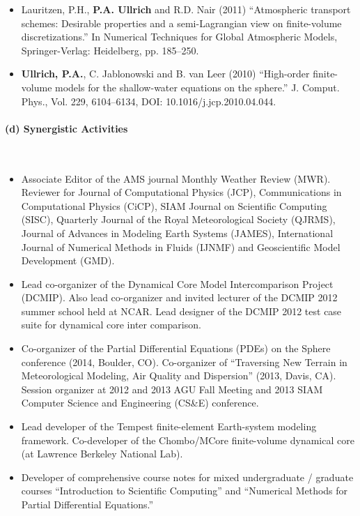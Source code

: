 \documentclass[11pt]{article}
\begin{document}
\begin{itemize}
\item Lauritzen, P.H., \textbf{P.A. Ullrich} and R.D. Nair (2011) ``Atmospheric transport schemes: Desirable properties and a semi-Lagrangian view on finite-volume discretizations.'' In Numerical Techniques for Global Atmospheric Models, Springer-Verlag: Heidelberg, pp. 185--250.

\item \textbf{Ullrich, P.A.}, C. Jablonowski and B. van Leer (2010) {``High-order finite-volume models for the shallow-water equations on the sphere.''}  J. Comput. Phys., Vol. 229, 6104--6134, DOI: 10.1016/j.jcp.2010.04.044.
\end{itemize}

\vspace{-0.5cm}
\paragraph{\large (d) Synergistic Activities}\ \\
\vspace{-0.8cm}
\begin{itemize}
\item Associate Editor of the AMS journal Monthly Weather Review (MWR).  Reviewer for Journal of Computational Physics (JCP), Communications in Computational Physics (CiCP), SIAM Journal on Scientific Computing (SISC), Quarterly Journal of the Royal Meteorological Society (QJRMS), Journal of Advances in Modeling Earth Systems (JAMES), International Journal of Numerical Methods in Fluids (IJNMF) and Geoscientific Model Development (GMD).
\item Lead co-organizer of the Dynamical Core Model Intercomparison Project (DCMIP).  Also lead co-organizer and invited lecturer of the DCMIP 2012 summer school held at NCAR.  Lead designer of the DCMIP 2012 test case suite for dynamical core inter comparison.
\item Co-organizer of the Partial Differential Equations (PDEs) on the Sphere conference (2014, Boulder, CO).  Co-organizer of  ``Traversing New Terrain in Meteorological Modeling, Air Quality and Dispersion'' (2013, Davis, CA). Session organizer at 2012 and 2013 AGU Fall Meeting and 2013 SIAM Computer Science and Engineering (CS\&E) conference.
\item Lead developer of the Tempest finite-element Earth-system modeling framework.  Co-developer of the Chombo/MCore finite-volume dynamical core (at Lawrence Berkeley National Lab).
\item Developer of comprehensive course notes for mixed undergraduate / graduate courses ``Introduction to Scientific Computing'' and ``Numerical Methods for Partial Differential Equations.''
\end{itemize}
\end{document}
